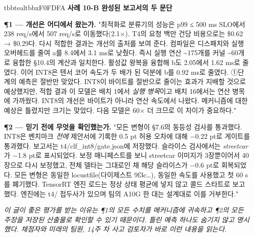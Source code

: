 \begin{calloutbox}{tbbteal}{tbbxF0FDFA}
{\normalsize\bfseries\color{tbbx115E59}사례 10-B  완성된 보고서의 두 문단}\par\vspace{3pt}
\textbf{¶1 — 개선은 어디에서 왔는가.} "최적화로 분류기의 성능은 p99 ≤ 500 ms SLO에서 238 req/s에서 507 req/s로 이동했다(2.1×). T4의 요청 백만 건당 비용으로는 \$0.62 → \$0.29다. 다시 적합한 결과는 개선의 출처를 보여 준다. 컴파일은 디스패치와 실행 오버헤드를 줄여 a를 8.4에서 3.1 ms로 낮췄다. 즉시 실행 연산 \textasciitilde{}175개를 커널 \textasciitilde{}60개로 융합한 §10.4의 계산과 일치한다. 활성값 왕복을 융합해 b도 2.05에서 1.62 ms로 줄였다. 이어 INT8은 텐서 코어 속도가 두 배가 된 덕분에 b를 0.92 ms로 줄였다. ①단계의 예측은 절반만 맞았다. INT8이 바이트를 절반으로 줄이는 효과가 지배할 것으로 예상했지만, 적합 결과 이 모델은 배치 1에서 \textit{실행 병목}이고 배치 16에서는 연산 병목에 가까웠다. INT8의 개선은 바이트가 아니라 연산 속도에서 나왔다. 메커니즘에 대한 예상은 틀렸지만 크기는 맞았다. 다음 모델은 60× 더 크므로 이 차이가 중요하다."

\textbf{¶2 — 믿기 전에 무엇을 확인했는가.} "모든 변형이 §7.6의 동등성 검사를 통과했다. INT8은 벤치마크 \textit{전에} 제안서에 기록한 0.5 pt 허용 오차에 대해 −0.22 pt로 게이트를 통과했다. 보고서는 t4/clf\_int8/gate.json에 저장했다. 슬라이스 검사에서는 \textit{streetcar}가 −1.8 pt로 표시되었다. 보정 매니페스트를 보니 streetcar 이미지가 3장뿐이어서 40장으로 다시 보정했고, 전체 델타는 그대로인 채 해당 슬라이스가 −0.6 pt로 회복되었다. 모든 변형은 동일한 locustfile(다이제스트 9f3c…), 동일한 속도를 사용했고 첫 60 s를 폐기했다. TensorRT 엔진 로드는 정상 상태 평균에 넣지 않고 콜드 스타트로 보고했다. 엔진에는 t4/ 접두사가 있으며 팀의 A10G 한 대는 설계대로 이를 거부한다."

\textit{이 글이 좋은 평가를 받는 이유는 ¶1의 모든 수치를 메커니즘에 귀속하고 ¶2의 모든 주장을 저장된 산출물로 확인할 수 있기 때문이다. 틀린 예측 하나도 숨기지 않고 명시했다. 채점자와 미래의 팀원, 14주 차 사고 검토자가 바로 이런 내용을 읽는다.}
\end{calloutbox}

\vspace{3.0pt}

